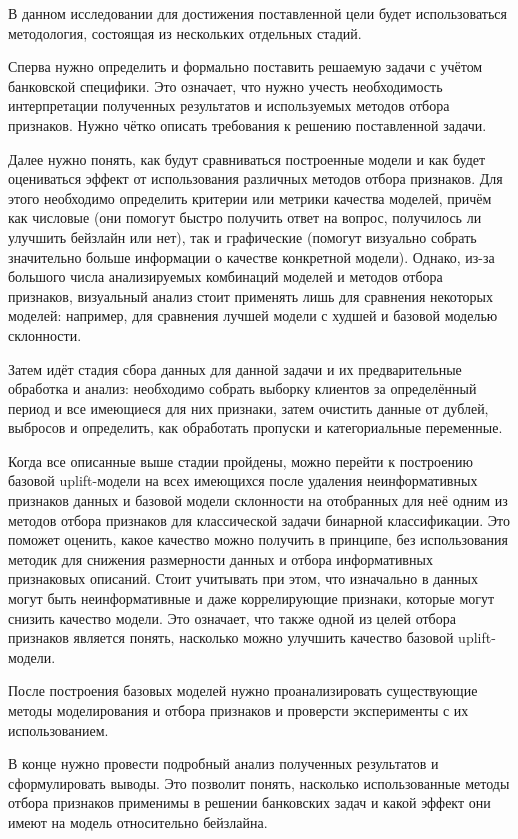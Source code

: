 В данном исследовании для достижения поставленной цели будет использоваться методология, состоящая из нескольких отдельных стадий.

Сперва нужно определить и формально поставить решаемую задачи с учётом банковской специфики. Это означает, что нужно учесть необходимость интерпретации полученных результатов и используемых методов отбора признаков. Нужно чётко описать требования к решению поставленной задачи.

Далее нужно понять, как будут сравниваться построенные модели и как будет оцениваться эффект от использования различных методов отбора признаков. Для этого необходимо определить критерии или метрики качества моделей, причём как числовые (они помогут быстро получить ответ на вопрос, получилось ли улучшить бейзлайн или нет), так и графические (помогут визуально собрать значительно больше информации о качестве конкретной модели). Однако, из-за большого числа анализируемых комбинаций моделей и методов отбора признаков, визуальный анализ стоит применять лишь для сравнения некоторых моделей: например, для сравнения лучшей модели с худшей и базовой моделью склонности.

Затем идёт стадия сбора данных для данной задачи и их предварительные обработка и анализ: необходимо собрать выборку клиентов за определённый период и все имеющиеся для них признаки, затем очистить данные от дублей, выбросов и определить, как обработать пропуски и категориальные переменные.

Когда все описанные выше стадии пройдены, можно перейти к построению базовой uplift-модели на всех имеющихся после удаления неинформативных признаков данных и базовой модели склонности на отобранных для неё одним из методов отбора признаков для классической задачи бинарной классификации. Это поможет оценить, какое качество можно получить в принципе, без использования методик для снижения размерности данных и отбора информативных признаковых описаний. Стоит учитывать при этом, что изначально в данных могут быть неинформативные и даже коррелирующие признаки, которые могут снизить качество модели. Это означает, что также одной из целей отбора признаков является понять, насколько можно улучшить качество базовой uplift-модели.

После построения базовых моделей нужно проанализировать существующие методы моделирования и отбора признаков и проверсти эксперименты с их использованием.

В конце нужно провести подробный анализ полученных результатов и сформулировать выводы. Это позволит понять, насколько использованные методы отбора признаков применимы в решении банковских задач и какой эффект они имеют на модель относительно бейзлайна.


